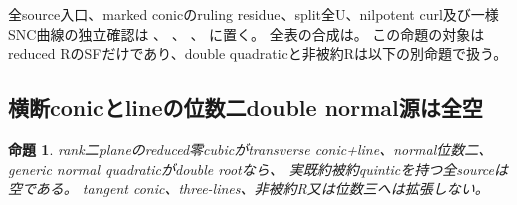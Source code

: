 \documentclass[a4paper,11pt]{ltjsarticle}
\newtheorem{proposition}{命題}[section]
\theoremstyle{definition}
\begin{document}
全source入口、marked conicのruling residue、split全U、nilpotent curl及び一様SNC曲線の独立確認は
、
、
、
に置く。
全表の合成は。
この命題の対象はreduced RのSFだけであり、double quadraticと非被約Rは以下の別命題で扱う。

\subsection{横断conicとlineの位数二double normal源は全空}
\begin{proposition}\label{prop:plane-m2-double-transverse-empty}
rank二planeのreduced零cubicがtransverse conic+line、normal位数二、generic normal quadraticがdouble rootなら、
実既約被約quinticを持つ全sourceは空である。
tangent conic、three-lines、非被約R又は位数三へは拡張しない。
\end{proposition}
\end{document}
